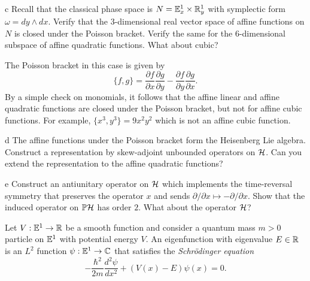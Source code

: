 \documentclass{pset}
\begin{document}
\begin{parts}
  \begin{part}{c}
    Recall that the classical phase space is $N=\mathbb{E}^1_x \times \mathbb{R}^1_y$ with symplectic form $\omega = dy\wedge dx$. Verify that the $3$-dimensional real vector space of affine functions on $N$ is closed under the Poisson bracket. Verify the same for the $6$-dimensional subspace of affine quadratic functions. What about cubic?
  \end{part}

  The Poisson bracket in this case is given by 
  \[
    \{f, g\} = \frac{\partial f}{\partial x}\frac{\partial g}{\partial y} - \frac{\partial f}{\partial y}\frac{\partial g}{\partial x}.
  \]
  By a simple check on monomials, it follows that the affine linear and affine quadratic functions are closed under the Poisson bracket, but not for affine cubic functions. For example, $\{x^3, y^3\} = 9x^2y^2$ which is not an affine cubic function.

  \begin{part}{d}
    The affine functions under the Poisson bracket form the Heisenberg Lie algebra. Construct a representation by skew-adjoint unbounded operators on $\mathcal{H}$. Can you extend the representation to the affine quadratic functions?
  \end{part}

  \begin{part}{e}
    Construct an antiunitary operator on $\mathcal{H}$ which implements the time-reversal symmetry that preserves the operator $x$ and sends $\partial/\partial x \mapsto - \partial / \partial x$. Show that the induced operator on $\mathbb{P}\mathcal{H}$ has order $2$. What about the operator $\mathcal{H}$?
  \end{part}
\end{parts}

\begin{problem}{3}
  Let $V : \mathbb{E}^1 \to \mathbb{R}$ be a smooth function and consider a quantum mass $m>0$ particle on $\mathbb{E}^1$ with potential energy $V$. An eigenfunction with eigenvalue $E\in \mathbb{R}$ is an $L^2$ function $\psi : \mathbb{E}^1 \to \mathbb{C}$ that satisfies the \emph{Schr\"odinger equation}
  \[-\frac{\hbar^2}{2m}\frac{d^2\psi}{dx^2} + (V(x) - E)\psi(x) = 0.\]
\end{problem}
\end{document}
